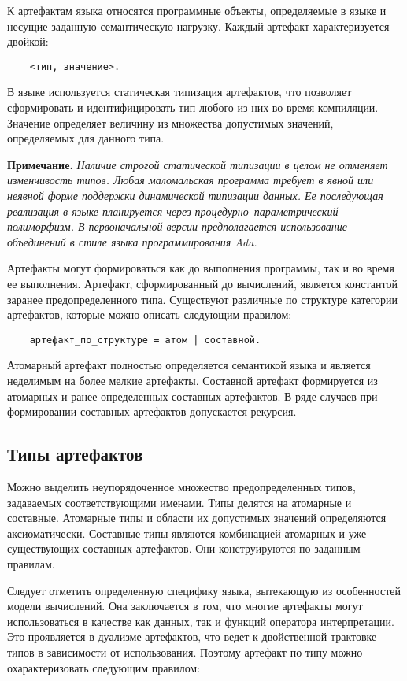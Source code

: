 {К артефактам языка относятся программные объекты, определяемые в языке и несущие заданную семантическую нагрузку. Каждый артефакт характеризуется двойкой:

\begin{verbatim}
    <тип, значение>.
\end{verbatim}

В языке используется статическая типизация артефактов, что позволяет сформировать и идентифицировать тип любого из них во время компиляции. Значение определяет величину из множества допустимых значений, определяемых для данного типа.

\textbf{Примечание.}
\textit{Наличие строгой статической типизации в целом не отменяет изменчивость типов. Любая маломальская программа требует в явной или неявной форме поддержки динамической типизации данных. Ее последующая реализация в языке планируется через процедурно--параметрический полиморфизм. В первоначальной версии предполагается использование объединений в стиле языка программирования Ada.}

Артефакты могут формироваться как до выполнения программы, так и во время ее выполнения. Артефакт, сформированный до вычислений, является константой заранее предопределенного типа. Существуют различные по структуре категории артефактов, которые можно описать следующим правилом:

\begin{verbatim}
    артефакт_по_структуре = атом | составной.
\end{verbatim}
Атомарный артефакт полностью определяется семантикой языка и является неделимым на более мелкие артефакты. Составной артефакт формируется из атомарных и ранее определенных составных артефактов. В ряде случаев при формировании составных артефактов допускается рекурсия.

\subsection{Типы артефактов}

Можно выделить неупорядоченное множество предопределенных типов, задаваемых соответствующими именами. Типы делятся на атомарные и составные. Атомарные типы и области их допустимых значений определяются аксиоматически. Составные типы являются комбинацией атомарных и уже существующих составных артефактов. Они конструируются по заданным правилам.

Следует отметить определенную специфику языка, вытекающую из особенностей модели вычислений. Она заключается в том, что многие артефакты могут использоваться в качестве как данных, так и функций оператора интерпретации. Это проявляется в дуализме артефактов, что ведет к двойственной трактовке типов в зависимости от использования. Поэтому артефакт по типу можно охарактеризовать следующим правилом:

}
